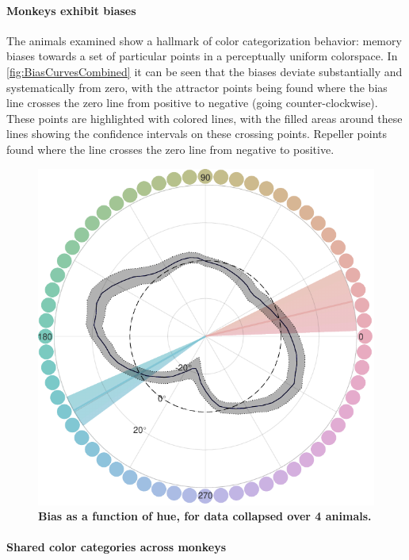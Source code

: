 
\paragraph{Monkeys exhibit biases} %

The animals examined show a hallmark of color categorization behavior: memory biases towards a set of particular points in a perceptually uniform colorspace.
In \autoref{fig:BiasCurvesCombined} it can be seen that the biases deviate substantially and systematically from zero, with the attractor points being found where the bias line crosses the zero line from positive to negative (going counter-clockwise). These points are highlighted with colored lines, with the filled areas around these lines showing the confidence intervals on these crossing points. Repeller points found where the line crosses the zero line from negative to positive.

\begin{figure}
\includegraphics[width=\linewidth]{../../../Analyses/combined/combined_categorybias2_230225.pdf}
\caption{\textbf{Bias as a function of hue, for data collapsed over 4 animals.} 
}
\label{fig:BiasCurvesCombined}
\end{figure}

\paragraph{Shared color categories across monkeys}

